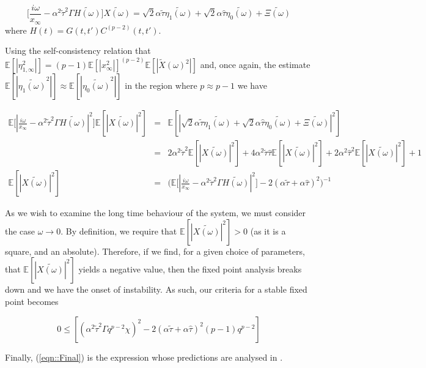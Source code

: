 \documentclass{article}
\newcommand{\ttau}{\tilde{\tau}}
\newcommand{\htau}{\hat{\tau}}
\newcommand{\xfixed}{x_\infty}
\newcommand{\eonef}{\eta_{1, \infty}}
\begin{document}
\begin{equation}
    \Big[ \frac{i \omega}{\xfixed} - \alpha^2 \ttau^2 \Gamma \tilde{H(\omega)} \Big] \tilde{X(\omega)} = \sqrt{2} \alpha \ttau \tilde{\eta_1 (\omega)} + \sqrt{2} \alpha \htau \tilde{\eta_0 (\omega)} + \tilde{\Xi(\omega)}
\end{equation}
%
where $H(t) = G(t, t')C^{(p-2)}(t, t')$. 

Using the self-consistency relation that $\mathbb{E}[|\eonef^2|] = (p-1)\mathbb{E}[|\xfixed^2|]^{(p-2)}\mathbb{E}[|\tilde{X}(\omega)^2|]$ and, once again, the estimate $\mathbb{E}[|\tilde{\eta_1 (\omega)}^2|] \approx \mathbb{E}[|\tilde{\eta_0 (\omega)}^2|]$ in the region where $p \approx p-1$ we have

\begin{eqnarray}
    \mathbb{E}\Big[| \frac{i \omega}{\xfixed} - \alpha^2 \ttau^2 \Gamma \tilde{H(\omega)}|^2 \Big] \mathbb{E}[|\tilde{X(\omega)}|^2] & = & \mathbb{E}[|\sqrt{2} \alpha \ttau \tilde{\eta_1 (\omega)} + \sqrt{2} \alpha \htau \tilde{\eta_0 (\omega)} + \tilde{\Xi(\omega)}|^2] \nonumber \\
    & = & 2 \alpha^2 \ttau^2 \mathbb{E}[|\tilde{X(\omega)}|^2] + 4 \alpha^2 \ttau \htau \mathbb{E}[|\tilde{X(\omega)}|^2] + 2 \alpha^2 \htau^2 \mathbb{E}[|\tilde{X(\omega)}|^2] + 1 \nonumber \\
    \mathbb{E}[|\tilde{X(\omega)}|^2] & = & \Big ( \mathbb{E}\Big[| \frac{i \omega}{\xfixed} - \alpha^2 \ttau^2 \Gamma \tilde{H(\omega)}|^2 \Big] - 2(\alpha \ttau + \alpha \htau)^2 \Big )^{-1}
\end{eqnarray}

As we wish to examine the long time behaviour of the system, we must consider the case $\omega \rightarrow 0$. By definition, we require that $\mathbb{E}[|\tilde{X(\omega)}|^2] > 0$ (as it is a square, and an absolute). Therefore, if we find, for a given choice of parameters, that $\mathbb{E}[|\tilde{X(\omega)}|^2]$ yields a negative value, then the fixed point analysis breaks down and we have the onset of instability. As such, our criteria for a stable fixed point becomes

\begin{equation}
    \label{eqn::Final}
    0 \leq \left [(\alpha^2 \ttau^2 \Gamma q^{p-2} \chi)^{2} - 2 (\alpha \ttau + \alpha \htau)^2 (p-1)q^{p-2} \right ]
\end{equation}

Finally, (\ref{eqn::Final}) is the expression whose predictions are analysed in \cite{MainPaper}. 
\end{document}
